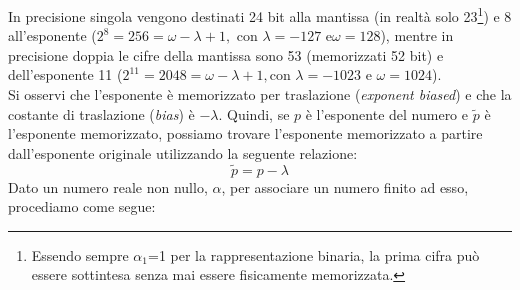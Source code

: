 \documentclass{article}
\numberwithin{equation}{section}
\begin{document}
\newpage
In precisione singola vengono destinati 24 bit alla mantissa (in realtà solo
23\footnote{Essendo sempre $\alpha_1$=1 per la rappresentazione binaria, la
prima cifra può essere sottintesa senza mai essere fisicamente memorizzata.}) e
8 all'esponente ($2^8=256=\omega-\lambda+1,\text{ con }\lambda=-127\text{ e
}\omega=128$), mentre in precisione doppia le cifre della mantissa sono 53
(memorizzati 52 bit) e dell'esponente 11 ($2^{11}=2048=\omega-\lambda+1,\text{
con }\lambda=-1023\text{ e }\omega=1024$).\\ 
Si osservi che l'esponente è memorizzato per traslazione (\textit{exponent
biased}) e che la costante di traslazione (\textit{bias}) è $-\lambda$. Quindi,
se $p$ è l'esponente del numero e $\tilde{p}$ è l'esponente memorizzato,
possiamo trovare l'esponente memorizzato a partire dall'esponente originale
utilizzando la seguente relazione:
$$\tilde{p}=p-\lambda$$
Dato un numero reale non nullo, $\alpha$, per associare un numero finito ad
esso, procediamo come segue:
\end{document}
